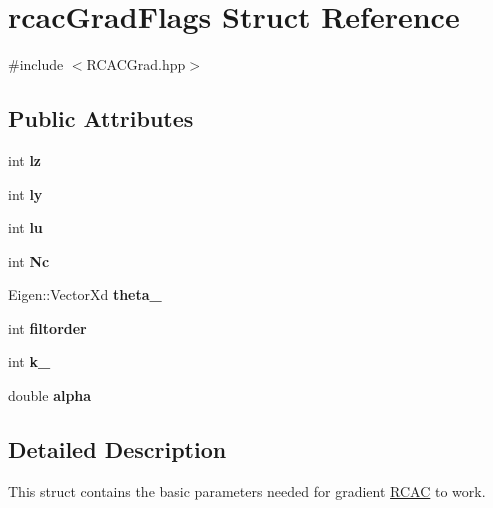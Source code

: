\hypertarget{structrcac_grad_flags}{}\section{rcac\+Grad\+Flags Struct Reference}
\label{structrcac_grad_flags}


{\ttfamily \#include $<$R\+C\+A\+C\+Grad.\+hpp$>$}

\subsection*{Public Attributes}
\begin{DoxyCompactItemize}
\item 
\mbox{\label{structrcac_grad_flags_aa41af27b85832a58edf4aa1004d5878e}} 
int {\bfseries lz}
\item 
\mbox{\label{structrcac_grad_flags_aeec5a48d77bbd2b772a7929ae88240f6}} 
int {\bfseries ly}
\item 
\mbox{\label{structrcac_grad_flags_a32e588defb7681a51047146f01ffc56a}} 
int {\bfseries lu}
\item 
\mbox{\label{structrcac_grad_flags_abd48ba6b1705024407c404ec1d516fbf}} 
int {\bfseries Nc}
\item 
\mbox{\label{structrcac_grad_flags_aa6a7ba7421f33b289a2a83dcc5126824}} 
Eigen\+::\+Vector\+Xd {\bfseries theta\+\_}
\item 
\mbox{\label{structrcac_grad_flags_a2e8e4e6f5aceab6ad374401323163bc0}} 
int {\bfseries filtorder}
\item 
\mbox{\label{structrcac_grad_flags_a9d997800d9823660dd77d0a13f07eb1d}} 
int {\bfseries k\+\_}
\item 
\mbox{\label{structrcac_grad_flags_a50b9a7a4eb078317dd355385b5975a18}} 
double {\bfseries alpha}
\end{DoxyCompactItemize}


\subsection{Detailed Description}
This struct contains the basic parameters needed for gradient \hyperlink{class_r_c_a_c}{R\+C\+AC} to work.


